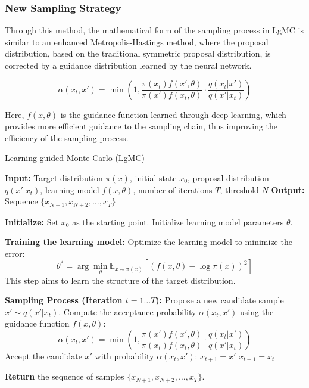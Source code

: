 \documentclass[twocolumn]{article}
\begin{document}
\subsubsection{New Sampling Strategy}
Through this method, the mathematical form of the sampling process in LgMC is similar to an enhanced Metropolis-Hastings method, where the proposal distribution, based on the traditional symmetric proposal distribution, is corrected by a guidance distribution learned by the neural network.

\[
\alpha(x_t, x') = \min \left( 1, \frac{\pi(x_t) f(x', \theta)}{\pi(x') f(x_t, \theta)} \cdot \frac{q(x_t|x')}{q(x'|x_t)} \right)
\]

Here, $f(x, \theta)$ is the guidance function learned through deep learning, which provides more efficient guidance to the sampling chain, thus improving the efficiency of the sampling process.


\begin{algorithm}[H]
\caption{Learning-guided Monte Carlo (LgMC)}
\begin{algorithmic}[1]
\State \textbf{Input:} Target distribution \(\pi(x)\), initial state \(x_0\), proposal distribution \(q(x'|x_t)\), learning model \(f(x, \theta)\), number of iterations \(T\), threshold $N$
\State \textbf{Output:} Sequence \(\{x_{N+1}, x_{N+2}, \dots, x_T\}\)

\State \textbf{Initialize:}
\State \quad Set \(x_0\) as the starting point.
\State \quad Initialize learning model parameters \(\theta\).

\State \textbf{Training the learning model:}
    \State Optimize the learning model to minimize the error:
    \[
    \theta^* = \arg\min_\theta \mathbb{E}_{x \sim \pi(x)} \left[ (f(x, \theta) - \log \pi(x))^2 \right]
    \]
    \State This step aims to learn the structure of the target distribution.
\EndFor

\State \textbf{Sampling Process (Iteration \(t = 1 \dots T\)):}
    \State Propose a new candidate sample \(x' \sim q(x'|x_t)\).
    \State Compute the acceptance probability \(\alpha(x_t, x')\) using the guidance function \(f(x, \theta)\):
    \[
    \alpha(x_t, x') = \min \left( 1, \frac{\pi(x') f(x', \theta)}{\pi(x_t) f(x_t, \theta)} \cdot \frac{q(x_t|x')}{q(x'|x_t)} \right)
    \]
    \State Accept the candidate \(x'\) with probability \(\alpha(x_t, x')\):
        \State \(x_{t+1} = x'\)
    \Else
        \State \(x_{t+1} = x_t\)
    \EndIf
\EndFor

\State \textbf{Return} the sequence of samples \(\{x_{N+1}, x_{N+2}, \dots, x_T\}\).
\end{algorithmic}
\end{algorithm}
\end{document}
